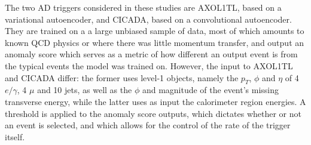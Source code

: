 The two AD triggers considered in these studies are AXOL1TL, based on a variational autoencoder, and CICADA, based on a convolutional autoencoder. They are trained on a a large unbiased sample of data, most of which amounts to known QCD physics or where there was little momentum transfer, and output an anomaly score which serves as a metric of how different an output event is from the typical events the model was trained on. However, the input to AXOL1TL and CICADA differ: the former uses level-1 objects, namely the $p_T$, $\phi$ and $\eta$ of 4 $e/\gamma$, 4 $\mu$ and 10 jets, as well as the $\phi$ and magnitude of the event's missing transverse energy, while the latter uses as input the calorimeter region energies. A threshold is applied to the anomaly score outputs, which dictates whether or not an event is selected, and which allows for the control of the rate of the trigger itself.




